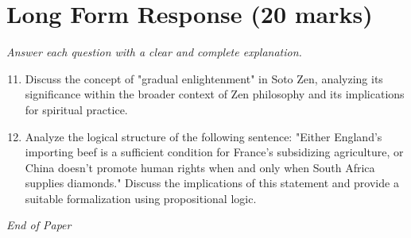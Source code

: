 \documentclass[12pt]{article}
\begin{document}
\section*{Long Form Response (20 marks)}
\textit{Answer each question with a clear and complete explanation.}
\begin{enumerate}[label=\arabic*.]
\setcounter{enumi}{10}
\item Discuss the concept of "gradual enlightenment" in Soto Zen, analyzing its significance within the broader context of Zen philosophy and its implications for spiritual practice.
\item Analyze the logical structure of the following sentence: "Either England's importing beef is a sufficient condition for France's subsidizing agriculture, or China doesn't promote human rights when and only when South Africa supplies diamonds." Discuss the implications of this statement and provide a suitable formalization using propositional logic.
\end{enumerate}

\vfill
\noindent\textit{End of Paper}
\end{document}
